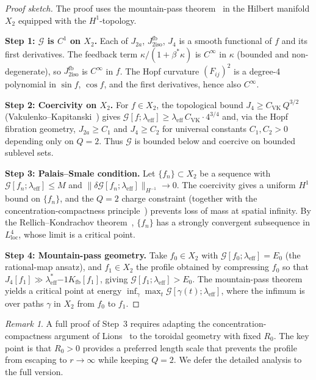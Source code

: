 \documentclass[11pt,a4paper]{article}
\newcommand{\leff}{\lambda_{\mathrm{eff}}}
\newcommand{\bst}{\beta^{*}}
\newcommand{\Kfb}{K_{\mathrm{fb}}}
\newcommand{\Jfb}{J_{2\mathrm{iso}}^{\mathrm{fb}}}
\newcommand{\Ja}{J_{2a}}
\newcommand{\Jfour}{J_{4}}
\newcommand{\kk}{\kappa}
\newcommand{\G}{\mathcal{G}}
\theoremstyle{remark}
\newtheorem{remark}[theorem]{Remark}
\begin{document}
\begin{proof}[Proof sketch]
The proof uses the mountain-pass theorem~\cite{AmbrosettiRabinowitz1973}
in the Hilbert manifold $X_2$ equipped with the $H^1$-topology.

\textbf{Step 1: $\G$ is $C^1$ on $X_2$.}
Each of $\Ja$, $\Jfb$, $\Jfour$ is a smooth functional of $f$ and its
first derivatives.  The feedback term $\kk/(1+\bst\kk)$ is $C^\infty$
in $\kk$ (bounded and non-degenerate), so $\Jfb$ is $C^\infty$ in $f$.
The Hopf curvature $(F_{ij})^2$ is a degree-4 polynomial in
$\sin f$, $\cos f$, and the first derivatives, hence also $C^\infty$.

\textbf{Step 2: Coercivity on $X_2$.}
For $f\in X_2$, the topological bound
$\Jfour \geq C_\mathrm{VK}\,Q^{3/2}$
(Vakulenko--Kapitanski~\cite{VK1979}) gives
$\G[f;\leff] \geq \leff\,C_\mathrm{VK}\cdot 4^{3/4}$
and, via the Hopf fibration geometry,
$\Ja \geq C_1$ and $\Jfour \geq C_2$ for universal constants $C_1,C_2>0$
depending only on $Q=2$.
Thus $\G$ is bounded below and coercive on bounded sublevel sets.

\textbf{Step 3: Palais--Smale condition.}
Let $\{f_n\}\subset X_2$ be a sequence with $\G[f_n;\leff]\leq M$
and $\|\delta\G[f_n;\leff]\|_{H^{-1}}\to 0$.
The coercivity gives a uniform $H^1$ bound on $\{f_n\}$, and the
$Q=2$ charge constraint (together with the
concentration-compactness principle~\cite{Lions1984a,Lions1984b})
prevents loss of mass at spatial infinity.
By the Rellich--Kondrachov theorem~\cite{Evans2010}, $\{f_n\}$ has a strongly
convergent subsequence in $L^4_\mathrm{loc}$, whose limit is a
critical point.

\textbf{Step 4: Mountain-pass geometry.}
Take $f_0\in X_2$ with $\G[f_0;\leff]=E_0$ (the rational-map ansatz),
and $f_1\in X_2$ the profile obtained by compressing $f_0$ so that
$\Jfour[f_1]\gg\leff^*{-1}\Kfb[f_1]$, giving $\G[f_1;\leff]>E_0$.
The mountain-pass theorem yields a critical point at energy
$\inf_\gamma\max_t \G[\gamma(t);\leff]$, where the infimum is over
paths $\gamma$ in $X_2$ from $f_0$ to $f_1$.
\end{proof}

\begin{remark}
A full proof of Step~3 requires adapting the concentration-compactness
argument of Lions~\cite{Lions1984a} to the toroidal geometry with
fixed $R_0$.  The key point is that $R_0>0$ provides a preferred
length scale that prevents the profile from escaping to
$r\to\infty$ while keeping $Q=2$.  We defer the detailed analysis
to the full version.
\end{remark}
\end{document}
